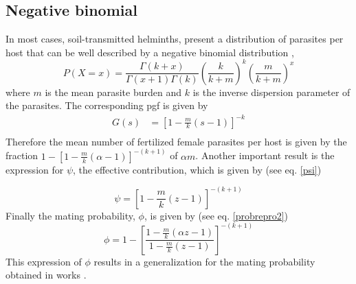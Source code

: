 \documentclass[12pt,a4paper]{article}
\theoremstyle{plain}%
\theoremstyle{definition}
\theoremstyle{remark}
\begin{document}
	
	
	\subsection{Negative binomial}
	In most cases, soil-transmitted helminths, present a distribution of parasites per host that can be well described by a negative binomial distribution \citep{bundy1987epidemiology,hoagland1978necator,seo1979frequency},
	\begin{equation}
	P(X=x)=\frac{\Gamma(k+x)}{\Gamma(x+1)\Gamma(k)}\left( \frac{k}{k+m}\right) ^k \left( \frac{m}{k+m}\right) ^x
	\end{equation}
	where $m$ is the mean parasite burden and $k$ is the inverse dispersion parameter of the parasites. The corresponding pgf is given by
	\begin{equation}
	\begin{split}
	G(s)&=\left[ 1-\frac{m}{k}(s-1)\right] ^{-k}\\
	\end{split}
	\end{equation}
	Therefore the mean number of fertilized female parasites per host is given by the fraction
	$ 1-\left[ 1-\frac{m}{k}(\alpha-1)\right] ^{-(k+1)} $  of $\alpha m$. 
	Another important result is the expression for $\psi$, the effective contribution, which is given by (see eq. \eqref{psi})
	
	\begin{equation}\label{phibn}
	\psi=	 \left[ 1-\frac{m}{k}(z-1)\right] ^{-(k+1)} 
	\end{equation}     
	Finally the mating probability, $\phi$, is given by (see eq. \eqref{probrepro2})
	\begin{equation} 
	\phi=
	1-\left[ \frac{ 1-\frac{m}{k}(\alpha z-1)}{1-\frac{m}{k}(z-1) }\right]  ^{-(k+1)} 
	\end{equation}
	This expression of $\phi$ results in a generalization for the mating probability obtained in works  \cite{anderson1992infectious,may1993biased,may1977togetherness}.
		
\end{document}
